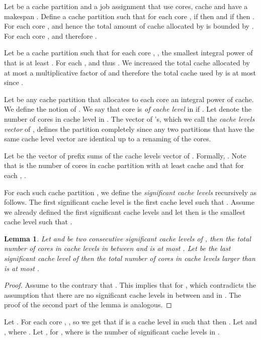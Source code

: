 \documentclass[11pt]{article}
\newtheorem{lemma}[theorem]{Lemma}
\begin{document}
Let  be a cache partition and a job assignment that use  cores,  cache and have a makespan .
Define a cache partition  such that for each core , if  then  and if  then . For each core ,  and hence the total amount of cache allocated by  is bounded by . For each core ,  and therefore .

Let  be a cache partition such that for each core , , the smallest integral power of  that is at least .
For each ,  and thus .  We increased the total cache allocated by at most a multiplicative factor of  and therefore the total cache used by  is at most  since .

Let  be any  cache partition that allocates  to each core
an integral power of  cache. We define the notion of
. We say that core  is \textit{of cache
level } in  if . Let  denote the number
of cores in cache level  in .
The vector of 's, which we call the \textit{cache levels
vector} of , defines the partition  completely
since any two partitions that have the same cache level vector are
identical up to a renaming of the cores.

Let  be the vector of prefix sums of the cache
levels vector of . Formally, . Note that 
is the number of cores in cache partition  with at least
 cache and that for each ,
.

For each such cache partition  , we define
the \textit{significant cache levels}  recursively as
follows. The first significant cache level  is the
first cache level  such that . Assume we already
defined the  first significant cache levels and let
 then  is the smallest cache level
 such that .


\begin{lemma}\label{consec}
Let  and  be two consecutive significant cache levels
of , then the total number of cores in cache levels in
between  and   is at most . Let
 be the last significant cache level of  then the total
number of cores in cache levels larger than  is at most
 .
\end{lemma}
\begin{proof}
Assume to the contrary that  . This implies that for ,  which contradicts the assumption that there are no significant cache
levels in between  and  in . The proof of the
second part of the lemma is analogous.
\end{proof}

Let . For each core ,  , so we get that if  is a cache level in  such
that  then . Let
 and , where .
 Let , for , where  is the number of
significant cache levels in .
\end{document}
